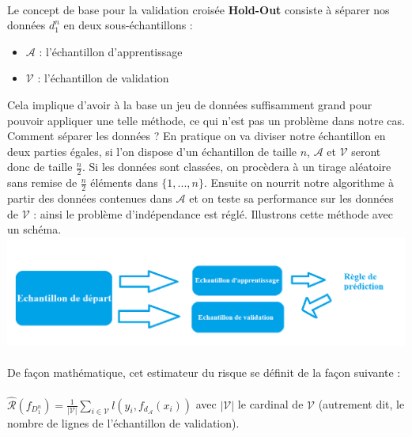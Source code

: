 \documentclass[14pt, openany]{article}
\begin{document}
\paragraph{}
Le concept de base pour la validation croisée \textbf{Hold-Out} consiste à séparer nos données $d^{n}_{1}$ en deux sous-échantillons :
\begin{itemize}
\item $\mathcal{A}$ : l'échantillon d'apprentissage
\item $\mathcal{V}$ : l'échantillon de validation
\end{itemize}
\bigskip
Cela implique d'avoir à la base un jeu de données suffisamment \og grand \fg{} pour pouvoir appliquer une telle méthode, ce qui n'est pas un problème dans notre cas. Comment séparer les données ? En pratique on va diviser notre échantillon en deux parties égales, si l'on dispose d'un échantillon de taille $n$, $\mathcal{A}$ et $\mathcal{V}$ seront donc de taille $\frac{n}{2}$. Si les données sont classées, on procèdera à un tirage aléatoire sans remise de $\frac{n}{2}$ éléments dans $\{1,...,n\}$.
Ensuite on \og nourrit \fg{} notre algorithme à partir des données contenues dans $\mathcal{A}$ et on teste sa performance sur les données de $\mathcal{V}$ : ainsi le problème d'indépendance est réglé. Illustrons cette méthode avec un schéma.\\
\includegraphics[width=16cm]{Images/hold_out.png}
\begin{center}
\label{fig1}
\end{center}
\paragraph{}
De façon mathématique, cet estimateur du risque se définit de la façon suivante :
\paragraph{}
$\widehat{\mathcal{R}}(f_{D^{n}_{1}}) = \frac{1}{|\mathcal{V}|} \sum\limits_{i \in \mathcal{V}} l(y_i,f_{d_{\mathcal{A}}}(x_i))$ avec $|\mathcal{V}|$ le cardinal de $\mathcal{V}$ (autrement dit, le nombre de lignes de l'échantillon de validation).
\end{document}
